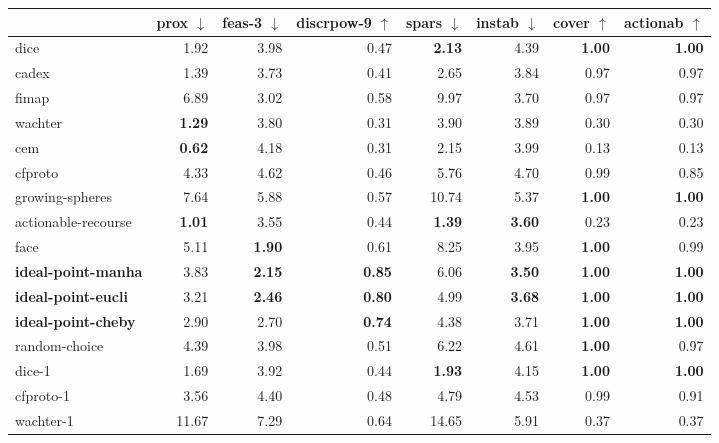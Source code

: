 \begin{tabular}{lrrrrrrr} \hline
 & prox $\downarrow$& feas-3 $\downarrow$& discrpow-9 $\uparrow$& spars $\downarrow$& instab $\downarrow$& cover $\uparrow$& actionab $\uparrow$\\ \hline
dice & 1.92 & 3.98 & 0.47 & \bfseries 2.13 & 4.39 & \bfseries 1.00 & \bfseries 1.00 \\ \hline
cadex & 1.39 & 3.73 & 0.41 & 2.65 & 3.84 & 0.97 & 0.97 \\ \hline
fimap & 6.89 & 3.02 & 0.58 & 9.97 & 3.70 & 0.97 & 0.97 \\ \hline
wachter & \bfseries 1.29 & 3.80 & 0.31 & 3.90 & 3.89 & 0.30 & 0.30 \\ \hline
cem & \bfseries 0.62 & 4.18 & 0.31 & 2.15 & 3.99 & 0.13 & 0.13 \\ \hline
cfproto & 4.33 & 4.62 & 0.46 & 5.76 & 4.70 & 0.99 & 0.85 \\ \hline
growing-spheres & 7.64 & 5.88 & 0.57 & 10.74 & 5.37 & \bfseries 1.00 & \bfseries 1.00 \\ \hline
actionable-recourse & \bfseries 1.01 & 3.55 & 0.44 & \bfseries 1.39 & \bfseries 3.60 & 0.23 & 0.23 \\ \hline
face & 5.11 & \bfseries 1.90 & 0.61 & 8.25 & 3.95 & \bfseries 1.00 & 0.99 \\ \hline
\bfseries ideal-point-manha & 3.83 & \bfseries 2.15 & \bfseries 0.85 & 6.06 & \bfseries 3.50 & \bfseries 1.00 & \bfseries 1.00 \\ \hline
\bfseries ideal-point-eucli & 3.21 & \bfseries 2.46 & \bfseries 0.80 & 4.99 & \bfseries 3.68 & \bfseries 1.00 & \bfseries 1.00 \\ \hline
\bfseries ideal-point-cheby & 2.90 & 2.70 & \bfseries 0.74 & 4.38 & 3.71 & \bfseries 1.00 & \bfseries 1.00 \\ \hline
random-choice & 4.39 & 3.98 & 0.51 & 6.22 & 4.61 & \bfseries 1.00 & 0.97 \\ \hline
dice-1 & 1.69 & 3.92 & 0.44 & \bfseries 1.93 & 4.15 & \bfseries 1.00 & \bfseries 1.00 \\ \hline
cfproto-1 & 3.56 & 4.40 & 0.48 & 4.79 & 4.53 & 0.99 & 0.91 \\ \hline
wachter-1 & 11.67 & 7.29 & 0.64 & 14.65 & 5.91 & 0.37 & 0.37 \\ \hline
\end{tabular}
